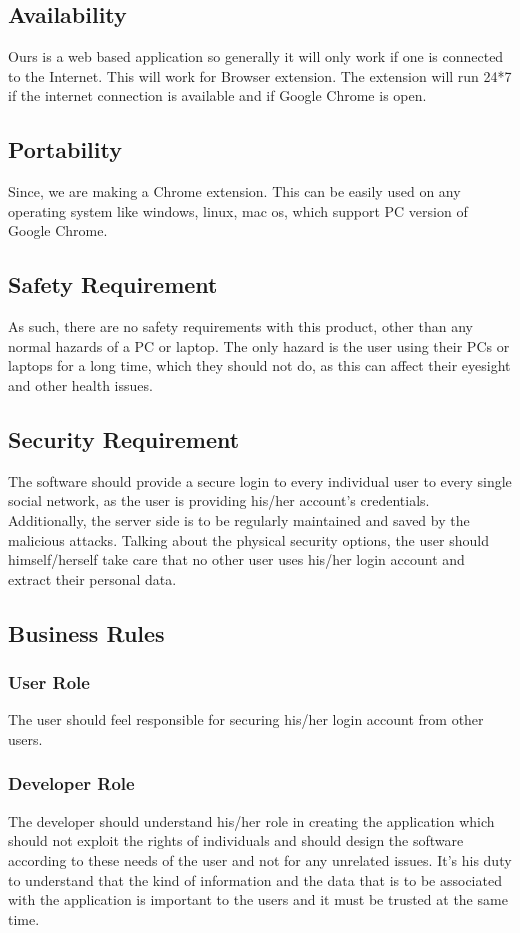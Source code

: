 \documentclass[12pt]{article}
\begin{document}
\subsection{Availability}
Ours is a web based application so generally it will only work if one is connected to the Internet. This will work for Browser extension. The extension will run 24*7 if the internet connection is
available and if Google Chrome is open.

\subsection{Portability}
Since, we are making a Chrome extension. This can be easily used on any operating system like windows, linux, mac os, which support PC version of Google Chrome.

\subsection{Safety Requirement}
As such, there are no safety requirements with this
product, other than any normal hazards of a PC or laptop.
The only hazard is the user using their PCs or laptops for a
long time, which they should not do, as this can affect their
eyesight and other health issues.

\subsection{Security Requirement}
The software should provide a secure login to every
individual user to every single social network, as the user is
providing his/her account’s credentials.
Additionally, the server side is to be regularly maintained
and saved by the malicious attacks. Talking about the physical
security options, the user should himself/herself take care that
no other user uses his/her login account and extract their
personal data.

\subsection{Business Rules}
\subsubsection{User Role}
The user should feel responsible for securing his/her login account from other users.
\subsubsection{Developer Role}
The developer should understand his/her role in creating the application which should not exploit the rights of individuals and should design the software according to these needs of the user and not for any unrelated issues. It’s his duty to understand that the kind of information and the data that is to be associated with the application is important to the users and it must be trusted at the same time.
\end{document}
